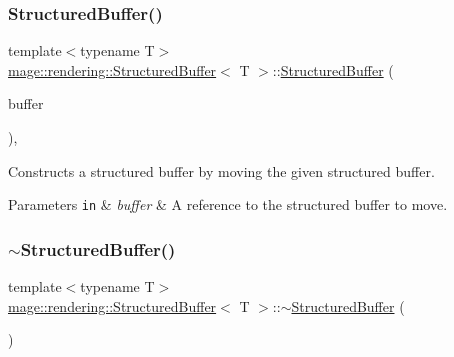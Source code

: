 \subsubsection{\texorpdfstring{Structured\+Buffer()}{StructuredBuffer()}\hspace{0.1cm}{\footnotesize\ttfamily [3/3]}}
{\footnotesize\ttfamily template$<$typename T$>$ \\
\mbox{\hyperlink{classmage_1_1rendering_1_1_structured_buffer}{mage\+::rendering\+::\+Structured\+Buffer}}$<$ T $>$\+::\mbox{\hyperlink{classmage_1_1rendering_1_1_structured_buffer}{Structured\+Buffer}} (\begin{DoxyParamCaption}\item[{\mbox{\hyperlink{classmage_1_1rendering_1_1_structured_buffer}{Structured\+Buffer}}$<$ T $>$ \&\&}]{buffer }\end{DoxyParamCaption})\hspace{0.3cm}{\ttfamily [default]}, {\ttfamily [noexcept]}}

Constructs a structured buffer by moving the given structured buffer.


\begin{DoxyParams}[1]{Parameters}
\mbox{\tt in}  & {\em buffer} & A reference to the structured buffer to move. \\
\hline
\end{DoxyParams}
\mbox{\label{classmage_1_1rendering_1_1_structured_buffer_abedc0f11782f0a321341a501267bb546}} 
\subsubsection{\texorpdfstring{$\sim$\+Structured\+Buffer()}{~StructuredBuffer()}}
{\footnotesize\ttfamily template$<$typename T$>$ \\
\mbox{\hyperlink{classmage_1_1rendering_1_1_structured_buffer}{mage\+::rendering\+::\+Structured\+Buffer}}$<$ T $>$\+::$\sim$\mbox{\hyperlink{classmage_1_1rendering_1_1_structured_buffer}{Structured\+Buffer}} (\begin{DoxyParamCaption}{ }\end{DoxyParamCaption})\hspace{0.3cm}{\ttfamily [default]}}

